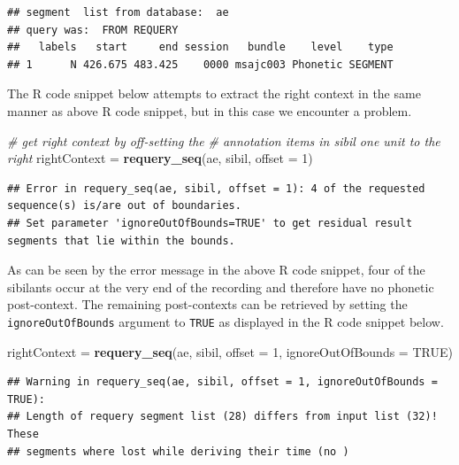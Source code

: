 \documentclass[]{book}
\newenvironment{Shaded}{\begin{snugshade}}{\end{snugshade}}
\newcommand{\CommentTok}[1]{\textcolor[rgb]{0.56,0.35,0.01}{\textit{#1}}}
\newcommand{\DataTypeTok}[1]{\textcolor[rgb]{0.13,0.29,0.53}{#1}}
\newcommand{\DecValTok}[1]{\textcolor[rgb]{0.00,0.00,0.81}{#1}}
\newcommand{\KeywordTok}[1]{\textcolor[rgb]{0.13,0.29,0.53}{\textbf{#1}}}
\newcommand{\NormalTok}[1]{#1}
\newcommand{\OtherTok}[1]{\textcolor[rgb]{0.56,0.35,0.01}{#1}}
\newcommand{\StringTok}[1]{\textcolor[rgb]{0.31,0.60,0.02}{#1}}
\theoremstyle{definition}
\theoremstyle{definition}
\theoremstyle{definition}
\theoremstyle{remark}
\begin{document}
\begin{verbatim}
## segment  list from database:  ae 
## query was:  FROM REQUERY 
##   labels   start     end session   bundle    level    type
## 1      N 426.675 483.425    0000 msajc003 Phonetic SEGMENT
\end{verbatim}

The R code snippet below attempts to extract the right context in the
same manner as above R code snippet, but in this case we encounter a
problem.

\begin{Shaded}
\begin{Highlighting}[]
\CommentTok{# get right context by off-setting the }
\CommentTok{# annotation items in sibil one unit to the right}
\NormalTok{rightContext =}\StringTok{ }\KeywordTok{requery_seq}\NormalTok{(ae, sibil, }\DataTypeTok{offset =} \DecValTok{1}\NormalTok{)}
\end{Highlighting}
\end{Shaded}

\begin{verbatim}
## Error in requery_seq(ae, sibil, offset = 1): 4 of the requested sequence(s) is/are out of boundaries.
## Set parameter 'ignoreOutOfBounds=TRUE' to get residual result segments that lie within the bounds.
\end{verbatim}

As can be seen by the error message in the above R code snippet, four of
the sibilants occur at the very end of the recording and therefore have
no phonetic post-context. The remaining post-contexts can be retrieved
by setting the \texttt{ignoreOutOfBounds} argument to \texttt{TRUE} as
displayed in the R code snippet below.

\begin{Shaded}
\begin{Highlighting}[]
\NormalTok{rightContext =}\StringTok{ }\KeywordTok{requery_seq}\NormalTok{(ae, sibil,}
                           \DataTypeTok{offset =} \DecValTok{1}\NormalTok{,}
                           \DataTypeTok{ignoreOutOfBounds =} \OtherTok{TRUE}\NormalTok{)}
\end{Highlighting}
\end{Shaded}

\begin{verbatim}
## Warning in requery_seq(ae, sibil, offset = 1, ignoreOutOfBounds = TRUE):
## Length of requery segment list (28) differs from input list (32)! These
## segments where lost while deriving their time (no )
\end{verbatim}
\end{document}
